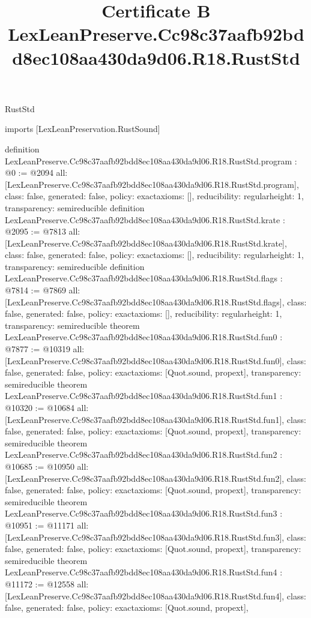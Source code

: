 \begin{lexlean}{RustStd}
\title{Certificate B LexLeanPreserve.Cc98c37aafb92bdd8ec108aa430da9d06.R18.RustStd}
\begin{coremodule}
imports [LexLeanPreservation.RustSound]

definition LexLeanPreserve.Cc98c37aafb92bdd8ec108aa430da9d06.R18.RustStd.program : @0 := @2094 {
  all: [LexLeanPreserve.Cc98c37aafb92bdd8ec108aa430da9d06.R18.RustStd.program],
  class: false,
  generated: false,
  policy: exact{axioms: []},
  reducibility: regular{height: 1},
  transparency: semireducible
}
definition LexLeanPreserve.Cc98c37aafb92bdd8ec108aa430da9d06.R18.RustStd.krate : @2095 := @7813 {
  all: [LexLeanPreserve.Cc98c37aafb92bdd8ec108aa430da9d06.R18.RustStd.krate],
  class: false,
  generated: false,
  policy: exact{axioms: []},
  reducibility: regular{height: 1},
  transparency: semireducible
}
definition LexLeanPreserve.Cc98c37aafb92bdd8ec108aa430da9d06.R18.RustStd.flags : @7814 := @7869 {
  all: [LexLeanPreserve.Cc98c37aafb92bdd8ec108aa430da9d06.R18.RustStd.flags],
  class: false,
  generated: false,
  policy: exact{axioms: []},
  reducibility: regular{height: 1},
  transparency: semireducible
}
theorem LexLeanPreserve.Cc98c37aafb92bdd8ec108aa430da9d06.R18.RustStd.fun0 : @7877 := @10319 {
  all: [LexLeanPreserve.Cc98c37aafb92bdd8ec108aa430da9d06.R18.RustStd.fun0],
  class: false,
  generated: false,
  policy: exact{axioms: [Quot.sound, propext]},
  transparency: semireducible
}
theorem LexLeanPreserve.Cc98c37aafb92bdd8ec108aa430da9d06.R18.RustStd.fun1 : @10320 := @10684 {
  all: [LexLeanPreserve.Cc98c37aafb92bdd8ec108aa430da9d06.R18.RustStd.fun1],
  class: false,
  generated: false,
  policy: exact{axioms: [Quot.sound, propext]},
  transparency: semireducible
}
theorem LexLeanPreserve.Cc98c37aafb92bdd8ec108aa430da9d06.R18.RustStd.fun2 : @10685 := @10950 {
  all: [LexLeanPreserve.Cc98c37aafb92bdd8ec108aa430da9d06.R18.RustStd.fun2],
  class: false,
  generated: false,
  policy: exact{axioms: [Quot.sound, propext]},
  transparency: semireducible
}
theorem LexLeanPreserve.Cc98c37aafb92bdd8ec108aa430da9d06.R18.RustStd.fun3 : @10951 := @11171 {
  all: [LexLeanPreserve.Cc98c37aafb92bdd8ec108aa430da9d06.R18.RustStd.fun3],
  class: false,
  generated: false,
  policy: exact{axioms: [Quot.sound, propext]},
  transparency: semireducible
}
theorem LexLeanPreserve.Cc98c37aafb92bdd8ec108aa430da9d06.R18.RustStd.fun4 : @11172 := @12558 {
  all: [LexLeanPreserve.Cc98c37aafb92bdd8ec108aa430da9d06.R18.RustStd.fun4],
  class: false,
  generated: false,
  policy: exact{axioms: [Quot.sound, propext]},
}
\end{coremodule}
\end{lexlean}
